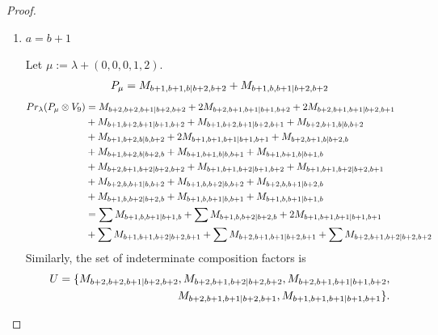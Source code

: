 \begin{proof}
\begin{enumerate}
\begin{enumerate}
      \item $a=b+1$\par
        Let $\mu:=\lambda + (0,0,0,1,2) $.
        \begin{equation}\notag
          \begin{aligned}
            P_\mu = M_{b+1,b+1,b|b+2,b+2}
+ M_{b+1,b,b+1|b+2,b+2}
          \end{aligned}
        \end{equation}
        \begin{equation}\notag
          \begin{aligned}
            Pr_{\lambda}(P_\mu \otimes V_{9}) &=
M_{b+2,b+2,b+1|b+2,b+2}
+ 2M_{b+2,b+1,b+1|b+1,b+2}
+ 2M_{b+2,b+1,b+1|b+2,b+1}\\
                                              &
+ M_{b+1,b+2,b+1|b+1,b+2}
+ M_{b+1,b+2,b+1|b+2,b+1}
+ M_{b+2,b+1,b|b,b+2}\\
                                              &
+ M_{b+1,b+2,b|b,b+2}
+ 2M_{b+1,b+1,b+1|b+1,b+1}
+ M_{b+2,b+1,b|b+2,b}\\
                                              &
+ M_{b+1,b+2,b|b+2,b}
+ M_{b+1,b+1,b|b,b+1}
+ M_{b+1,b+1,b|b+1,b}\\
                                              &
+ M_{b+2,b+1,b+2|b+2,b+2}
+ M_{b+1,b+1,b+2|b+1,b+2}
+ M_{b+1,b+1,b+2|b+2,b+1}\\
                                              &
+ M_{b+2,b,b+1|b,b+2}
+ M_{b+1,b,b+2|b,b+2}
+ M_{b+2,b,b+1|b+2,b}\\
                                              &
+ M_{b+1,b,b+2|b+2,b}
+ M_{b+1,b,b+1|b,b+1}
+ M_{b+1,b,b+1|b+1,b} \\
                                               &=
\sum M_{b+1,b,b+1|b+1,b}
+ \sum M_{b+1,b,b+2|b+2,b}
+ 2 M_{b+1,b+1,b+1|b+1,b+1}\\
                                              &
+ \sum M_{b+1,b+1,b+2|b+2,b+1}
+ \sum M_{b+2,b+1,b+1|b+2,b+1}
+ \sum M_{b+2,b+1,b+2|b+2,b+2}
          \end{aligned}
        \end{equation}
      Similarly, the set of indeterminate composition factors is 
\begin{equation}\notag
  \begin{aligned}
    U = \{
M_{b+2,b+2,b+1|b+2,b+2},
M_{b+2,b+1,b+2|b+2,b+2},
M_{b+2,b+1,b+1|b+1,b+2},\\
M_{b+2,b+1,b+1|b+2,b+1},
M_{b+1,b+1,b+1|b+1,b+1}
\}.
  \end{aligned}

\end{equation}
\end{enumerate}
\end{enumerate}
\end{proof}
